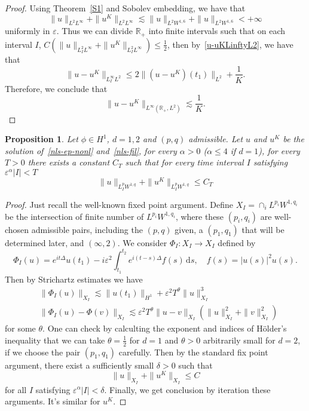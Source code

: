 \documentclass[10pt,a4paper]{article}
\newtheorem{proposition}[theorem]{Proposition}
\begin{document}
  \begin{proof}
    Using Theorem~\ref{S1} and Sobolev embedding, we have that 
    \[ \|u\|_{L^2L^\infty}+\|u^K\|_{L^2L^\infty} \lesssim \|u\|_{L^2W^{1,6}} +
    \|u\|_{L^2W^{1,6}} < +\infty \]
    uniformly in \(\varepsilon\). Thus we can divide \(\mathbb R_+\) into finite 
    intervals such that on each interval \(I\), \(C (\|u\|_{L^2_I L^\infty} + 
    \|u^K\|_{L^2_I L^\infty}) \leq \frac12\), then by~\eqref{u-uKLinftyL2}, we
    have that 
    \[ \|u-u^K\|_{L^\infty_I L^2} \leq 2\|(u-u^K)(t_1)\|_{L^2} + \frac1K. \]
    Therefore, we conclude that 
    \[ \|u-u^K\|_{L^\infty({\mathbb R_+},L^2)} \lesssim \frac1K. \]
  \end{proof}


  \begin{proposition}
    Let \(\phi\in H^1\), \(d=1,2\) and \((p,q)\) admissible. Let \(u\) and \(u^K\) be the solution 
    of~\eqref{nls-ep-nonl} and~\eqref{nls-fil}, for every \(\alpha>0\) (\(\alpha
    \leq 4\) if \(d=1\)), for every \(T>0\) there exists a constant \(C_T\) such that for every
    time interval \(I\) satisfying \(\varepsilon^\alpha|I|<T\)
    \[ \|u\|_{L^p_I W^{1,q}} + \|u^K\|_{L^p_I W^{1,q}} \leq C_T \]
  \end{proposition}

  \begin{proof}
    Just recall the well-known fixed point argument. Define \(X_I=\cap_i L^{p_i} W^{1,q_i}\) 
    be the intersection of finite number of \(L^{p_i} W^{1,q_i}\), where these \((p_i,q_i)\) are 
    well-chosen admissible pairs, including the \((p,q)\) given, a \((p_1,q_1)\)
    that will be determined later, and \((\infty,2)\). We consider 
    \(\Phi_I: X_I \to X_I\) 
    defined by
    \[ \Phi_I(u) = e^{it\Delta} u(t_1) - i\varepsilon^2 \int_{t_1}^{t_2} e^{i(t-s)\Delta}
    f(s)\,\mathrm{d}s, \quad f(s)=|u(s)|^2u(s). \]
    Then by Strichartz estimates we have
    \begin{equation}
      \begin{aligned}
        & \|\Phi_I(u)\|_{X_I} \lesssim \|u(t_1)\|_{H^1} + \varepsilon^2
        T^\theta \|u\|_{X_I}^3 \\
        & \|\Phi_I(u)-\Phi(v)\|_{X_I} \lesssim \varepsilon^2
        T^\theta \|u-v\|_{X_I} (\|u\|_{X_I}^2 + \|v\|_{X_I}^2) 
      \end{aligned}
    \end{equation}
    for some \(\theta\). One can check by calculting the exponent and indices of
    H\"older's inequality that we can take
    \(\theta=\frac12\) for \(d=1\) and \(\theta>0\) arbitrarily small for \(d=2\),
    if we choose the pair \((p_1,q_1)\) carefully.
    Then by the standard fix point argument, there exist a sufficiently small
    \(\delta>0\) such that 
    \[ \|u\|_{X_I} + \|u^K\|_{X_I} \leq C \]
    for all \(I\) satisfying \(\varepsilon^\alpha|I|<\delta\). Finally, we get
    conclusion by iteration these arguments. It's similar for \(u^K\).
  \end{proof}
\end{document}
